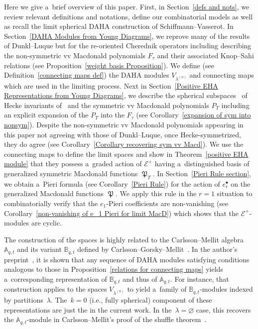 \documentclass[pdftex]{sigma}
\numberwithin{equation}{section}
\theoremstyle{definition}
\DeclareMathOperator{\MacD}{\mathfrak{P}}
\begin{document}
Here we give a~brief overview of this paper. First, in Section~\ref{defs and nots}, we review relevant definitions and notations, define our combinatorial models as well as recall the limit spherical DAHA construction of Schiffmann--Vasserot. In Section~\ref{DAHA Modules from Young Diagrams}, we reprove many of the results of Dunkl--Luque but for the re-oriented Cherednik operators including describing the non-symmetric vv Macdonald polynomials $F_{\tau}$ and their associated Knop--Sahi relations (see Proposition~\ref{weight basis Proposition}). We define (see Definition~\ref{connecting maps def}) the DAHA modules $V_{\lambda^{(n)}}$ and connecting maps  which are used in the limiting process. Next in Section~\ref{Positive EHA Representations from Young Diagrams}, we describe the spherical subspaces~ of Hecke invariants of~ and the symmetric vv Macdonald polynomials $P_{T}$ including an explicit expansion of the $P_{T}$ into the $F_{\tau}$ (see Corollary~\ref{expansion of sym into nonsym}). Despite the non-symmetric vv Macdonald polynomials appearing in this paper not agreeing with those of Dunkl--Luque, once Hecke-symmetrized, they do agree (see Corollary~\ref{Corollary recovering sym vv Macd}). We use the connecting maps to define the limit spaces  and show in Theorem~\ref{positive EHA module} that they possess a~graded action of $\mathcal{E}^{+}$ having a~distinguished basis of generalized symmetric Macdonald functions $\MacD_{T}$. In Section~\ref{Pieri Rule section}, we obtain a~Pieri formula (see Corollary~\ref{Pieri Rule}) for the action of $e_r^{\bullet}$ on the generalized Macdonald functions $\MacD$. We apply this rule in the $r=1$ situation to combinatorially verify that the $e_1$-Pieri coefficients are non-vanishing (see Corollary~\ref{non-vanishing of e_1 Pieri for limit MacD}) which shows that the $\mathcal{E}^+$-modules  are cyclic.

The construction of the spaces  is highly related to the Carlsson--Mellit algebra $\mathbb{A}_{q,t}$ \cite{CM_2015} and its variant $\mathbb{B}_{q,t}$ defined by Carlsson--Gorsky--Mellit~\cite{CGM_2017}. In the author's preprint~\cite{DDPA_BW}, it is shown that any sequence of DAHA modules satisfying conditions analogous to those in Proposition~\ref{relations for connecting maps} yields a~corresponding representation of $\mathbb{B}_{q,t}$ and thus of $\mathbb{A}_{q,t}$. For instance, that construction applies to the spaces $V_{\lambda^{(n)}}$ to yield a~family of $\mathbb{B}_{q,t}$-modules indexed by partitions~$\lambda$. The~${k=0}$ (i.e., fully spherical) component of these representations are just the  in the current work. In the~${\lambda = \varnothing}$ case, this recovers the $\mathbb{A}_{q,t}$-module in Carlsson--Mellit's proof of the shuffle theorem~\cite{CM_2015}.
\end{document}
